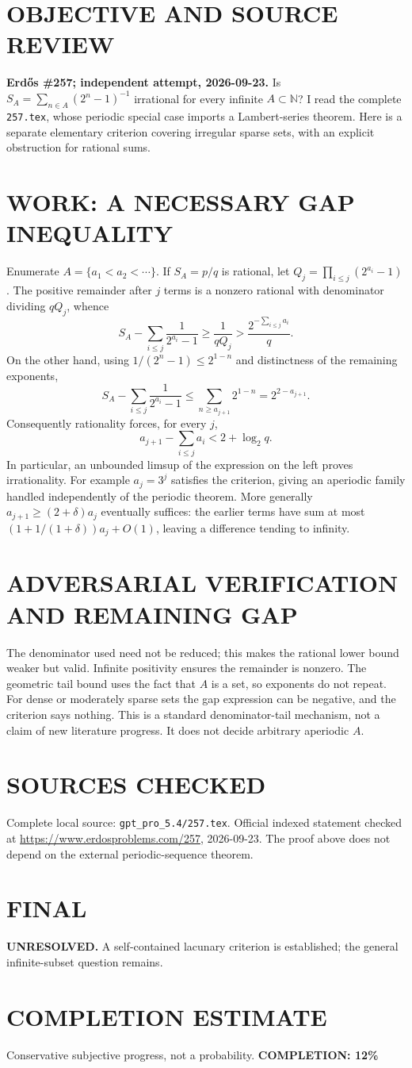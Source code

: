 \section{OBJECTIVE AND SOURCE REVIEW}
\textbf{Erd\H{o}s \#257; independent attempt, 2026-09-23.}
Is $S_A=\sum_{n\in A}(2^n-1)^{-1}$ irrational for every infinite $A\subset\mathbb N$? I read the complete \texttt{257.tex}, whose periodic special case imports a Lambert-series theorem. Here is a separate elementary criterion covering irregular sparse sets, with an explicit obstruction for rational sums.
\section{WORK: A NECESSARY GAP INEQUALITY}
Enumerate $A=\{a_1<a_2<\cdots\}$. If $S_A=p/q$ is rational, let $Q_j=\prod_{i\le j}(2^{a_i}-1)$. The positive remainder after $j$ terms is a nonzero rational with denominator dividing $qQ_j$, whence
\[
S_A-\sum_{i\le j}\frac1{2^{a_i}-1}\ge\frac1{qQ_j}
>\frac{2^{-\sum_{i\le j}a_i}}q.
\]
On the other hand, using $1/(2^n-1)\le2^{1-n}$ and distinctness of the remaining exponents,
\[
S_A-\sum_{i\le j}\frac1{2^{a_i}-1}
\le\sum_{n\ge a_{j+1}}2^{1-n}=2^{2-a_{j+1}}.
\]
Consequently rationality forces, for every $j$,
\[
a_{j+1}-\sum_{i\le j}a_i<2+\log_2q.
\]
In particular, an unbounded limsup of the expression on the left proves irrationality. For example $a_j=3^j$ satisfies the criterion, giving an aperiodic family handled independently of the periodic theorem. More generally $a_{j+1}\ge(2+\delta)a_j$ eventually suffices: the earlier terms have sum at most $(1+1/(1+\delta))a_j+O(1)$, leaving a difference tending to infinity.
\section{ADVERSARIAL VERIFICATION AND REMAINING GAP}
The denominator used need not be reduced; this makes the rational lower bound weaker but valid. Infinite positivity ensures the remainder is nonzero. The geometric tail bound uses the fact that $A$ is a set, so exponents do not repeat. For dense or moderately sparse sets the gap expression can be negative, and the criterion says nothing. This is a standard denominator-tail mechanism, not a claim of new literature progress. It does not decide arbitrary aperiodic $A$.
\section{SOURCES CHECKED}
Complete local source: \texttt{gpt\_pro\_5.4/257.tex}. Official indexed statement checked at \url{https://www.erdosproblems.com/257}, 2026-09-23. The proof above does not depend on the external periodic-sequence theorem.
\section{FINAL}
\textbf{UNRESOLVED.} A self-contained lacunary criterion is established; the general infinite-subset question remains.
\section{COMPLETION ESTIMATE}
Conservative subjective progress, not a probability.
\textbf{COMPLETION: 12\%}
